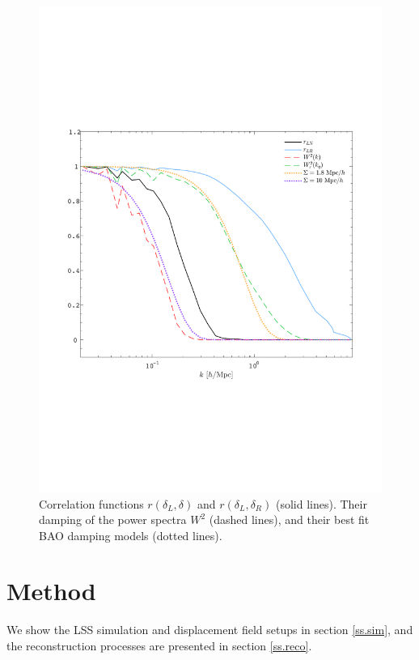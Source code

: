 \documentclass[aps,prd,twocolumn,superscriptaddress,amsfont,amssymb,amsmath,nofootinbib,showpacs,balancelastpage]{revtex4-1}
\begin{document}
\begin{figure}[t] \centering
  \includegraphics[width=1.0\linewidth]{fig2.pdf}
  \caption{Correlation functions $r(\delta_L,\delta)$ and $r(\delta_L,\delta_R)$
  (solid lines). Their
  damping of the power spectra $W^2$ (dashed lines),
  and their best fit BAO damping models (dotted lines).}
  \label{fig.2}
\end{figure}



\section{Method}\label{sec.method}
We show the LSS simulation and displacement field setups in section \ref{ss.sim},
and the reconstruction processes are presented in section \ref{ss.reco}.
\end{document}
